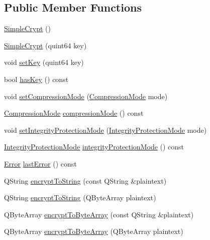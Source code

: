 \subsection*{Public Member Functions}
\begin{DoxyCompactItemize}
\item 
\hyperlink{classSimpleCrypt_ac474d12cfa9f93bfecea35891831046d}{Simple\+Crypt} ()
\item 
\hyperlink{classSimpleCrypt_a65942757b85b3dd36618ea3edc5ceb89}{Simple\+Crypt} (quint64 key)
\item 
void \hyperlink{classSimpleCrypt_aa7aad9ed2e88b883ba9214c7d9928745}{set\+Key} (quint64 key)
\item 
bool \hyperlink{classSimpleCrypt_ad800808bcffc9a09225c651200b3ef5c}{has\+Key} () const
\item 
void \hyperlink{classSimpleCrypt_adc6c6355aa276c0d3516f7ad273f063b}{set\+Compression\+Mode} (\hyperlink{classSimpleCrypt_a25298e746f175cf175a18f082092ca8e}{Compression\+Mode} mode)
\item 
\hyperlink{classSimpleCrypt_a25298e746f175cf175a18f082092ca8e}{Compression\+Mode} \hyperlink{classSimpleCrypt_ac0a68b3ef5441aaf7724f11376e036bd}{compression\+Mode} () const
\item 
void \hyperlink{classSimpleCrypt_a4fef5e6d3246ee57d6a7b68475b12b8b}{set\+Integrity\+Protection\+Mode} (\hyperlink{classSimpleCrypt_a42a5172e558d346b28421cc4e85feb2d}{Integrity\+Protection\+Mode} mode)
\item 
\hyperlink{classSimpleCrypt_a42a5172e558d346b28421cc4e85feb2d}{Integrity\+Protection\+Mode} \hyperlink{classSimpleCrypt_ac8940489ec63b0022335d9d6ab3b11a1}{integrity\+Protection\+Mode} () const
\item 
\hyperlink{classSimpleCrypt_ab7f81049e78f021b55a36f7cfac5a09b}{Error} \hyperlink{classSimpleCrypt_acb412b13386bf2bcb31552bc40949b39}{last\+Error} () const
\item 
Q\+String \hyperlink{classSimpleCrypt_af26a3d3c6cef9732190c1d2c6a53a5b5}{encrypt\+To\+String} (const Q\+String \&plaintext)
\item 
Q\+String \hyperlink{classSimpleCrypt_aa72b79bf7a5bb971bf3b0a52b9247efd}{encrypt\+To\+String} (Q\+Byte\+Array plaintext)
\item 
Q\+Byte\+Array \hyperlink{classSimpleCrypt_ae1991c7748b2bb74468bee0be372d2c4}{encrypt\+To\+Byte\+Array} (const Q\+String \&plaintext)
\item 
Q\+Byte\+Array \hyperlink{classSimpleCrypt_a741305d04e86bcb7d4625b05bf234887}{encrypt\+To\+Byte\+Array} (Q\+Byte\+Array plaintext)

\end{DoxyCompactItemize}
